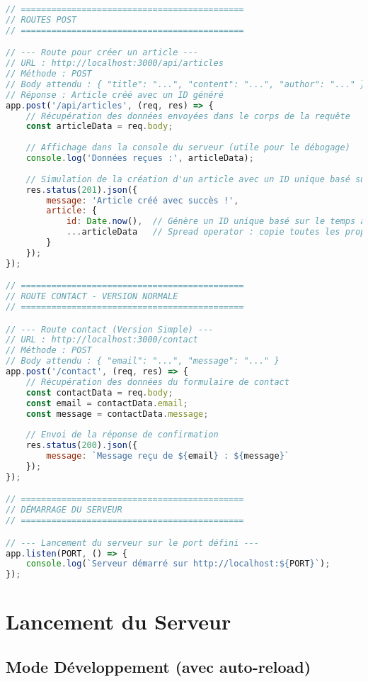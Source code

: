 \documentclass[12pt,a4paper]{article}
\begin{document}
\begin{lstlisting}[language=javascript, caption=Code du serveur Express]
// ============================================
// ROUTES POST
// ============================================

// --- Route pour créer un article ---
// URL : http://localhost:3000/api/articles
// Méthode : POST
// Body attendu : { "title": "...", "content": "...", "author": "..." }
// Réponse : Article créé avec un ID généré
app.post('/api/articles', (req, res) => {
    // Récupération des données envoyées dans le corps de la requête
    const articleData = req.body;
    
    // Affichage dans la console du serveur (utile pour le débogage)
    console.log('Données reçues :', articleData);
    
    // Simulation de la création d'un article avec un ID unique basé sur le timestamp
    res.status(201).json({
        message: 'Article créé avec succès !',
        article: { 
            id: Date.now(),  // Génère un ID unique basé sur le temps actuel
            ...articleData   // Spread operator : copie toutes les propriétés de articleData
        }
    });
});

// ============================================
// ROUTE CONTACT - VERSION NORMALE
// ============================================

// --- Route contact (Version Simple) ---
// URL : http://localhost:3000/contact
// Méthode : POST
// Body attendu : { "email": "...", "message": "..." }
app.post('/contact', (req, res) => {
    // Récupération des données du formulaire de contact
    const contactData = req.body;
    const email = contactData.email;
    const message = contactData.message;
    
    // Envoi de la réponse de confirmation
    res.status(200).json({
        message: `Message reçu de ${email} : ${message}`
    });
});

// ============================================
// DÉMARRAGE DU SERVEUR
// ============================================

// --- Lancement du serveur sur le port défini ---
app.listen(PORT, () => {
    console.log(`Serveur démarré sur http://localhost:${PORT}`);  
});
\end{lstlisting}

\section{Lancement du Serveur}

\subsection{Mode Développement (avec auto-reload)}
\end{document}
